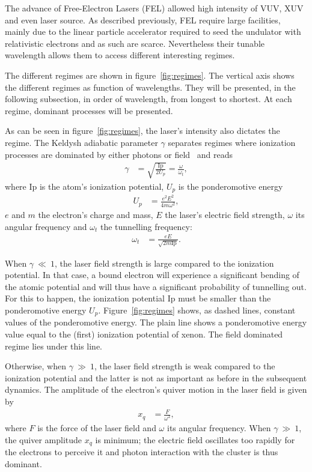 The advance of Free-Electron Lasers (FEL) allowed high intensity of VUV, XUV and
even \xray laser source. As described previously, FEL require large facilities,
mainly due to the linear particle accelerator required to seed the undulator
with relativistic electrons and as such are scarce. Nevertheless their
tunable wavelength allows them to access different interesting regimes.

The different regimes are shown in figure~\ref{fig:regimes}.
The vertical axis shows the different regimes as
function of wavelengths. They will be presented, in the following subsection,
in order of wavelength, from longest to shortest. At each regime, dominant
processes will be presented.

As can be seen in figure~\ref{fig:regimes}, the laser's intensity also dictates
the regime.
The Keldysh adiabatic parameter $\gamma$ separates regimes where ionization
processes are dominated by either photons or field~\cite{Long2010} and reads
\begin{align}
\gamma & = \sqrt{ \frac{\textrm{Ip}}{2 U_p} } = \frac{\omega}{\omega_t},
\end{align}
where Ip is the atom's ionization potential, $U_p$ is the ponderomotive energy
\begin{align}
U_p & = \frac{e^2 E^2}{4 m \omega^2},
\end{align}
$e$ and $m$ the electron's charge and mass, $E$ the laser's electric field
strength, $\omega$ its angular frequency and $\omega_t$ the tunnelling
frequency:
\begin{align}
\omega_t & = \frac{e E}{\sqrt{2 m \textrm{Ip}}}.
\end{align}

When $\gamma~\ll~1$, the laser field strength is large compared to the ionization
potential. In that case, a bound electron will experience a significant bending of the
atomic potential and will thus have a significant probability of tunnelling out.
For this to happen, the ionization potential Ip must be
smaller than the ponderomotive energy $U_p$. Figure~\ref{fig:regimes} shows,
as dashed lines, constant values of the ponderomotive energy. The plain line shows
a ponderomotive energy value equal to the (first) ionization potential of xenon.
The field dominated regime lies under this line.

Otherwise, when $\gamma~\gg~1$, the laser field strength is weak compared to
the ionization potential and the latter is not as important as before in the
subsequent dynamics. The amplitude of the electron's quiver motion in the laser
field is given by
\begin{align}
x_q & = \frac{F}{\omega^2},
\label{eqn:quiver}
\end{align}
where $F$ is the force of the laser field and $\omega$ its angular frequency.
When $\gamma~\gg~1$, the quiver amplitude $x_q$ is minimum; the electric field
oscillates too rapidly for the electrons to perceive it and photon interaction with
the cluster is thus dominant.

